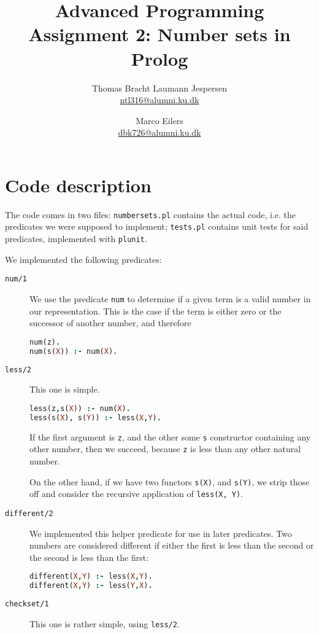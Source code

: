 \documentclass[a4paper]{article}
\title{Advanced Programming\\ Assignment 2: Number sets in Prolog}
\author{Thomas Bracht Laumann Jespersen\\ \url{ntl316@alumni.ku.dk} \and Marco Eilers\\ \url{dbk726@alumni.ku.dk} }
\newcommand{\pfuncn}[2]{\textnormal{\texttt{#1/#2}}\xspace}
\begin{document}
\maketitle
\section*{Code description}
The code comes in two files: \texttt{numbersets.pl} contains the actual code, i.e. the predicates we were supposed to implement; \texttt{tests.pl} contains unit tests for said predicates, implemented with \texttt{plunit}.

We implemented the following predicates:

\begin{description}
\item[\pfuncn{num}{1}] We use the predicate \texttt{num} to determine if a given term is a valid number in our representation. This is the case if the term is either zero or the successor of another number, and therefore
\begin{lstlisting}[language=prolog]
num(z).
num(s(X)) :- num(X).
\end{lstlisting}
\item[\pfuncn{less}{2}] This one is simple.
\begin{lstlisting}[language=prolog]
less(z,s(X)) :- num(X).
less(s(X), s(Y)) :- less(X,Y).
\end{lstlisting}
If the first argument is \texttt{z}, and the other some \texttt{s} constructor containing any other number, then we succeed, because \texttt{z} is less than any other natural number.

On the other hand, if we have two functors \texttt{s(X)}, and \texttt{s(Y)}, we strip those off and consider the recursive application of \texttt{less(X, Y)}.
\item[\pfuncn{different}{2}] We implemented this helper predicate for use in later predicates. Two numbers are considered different if either the first is less than the second or the second is less than the first:
\begin{lstlisting}[language=prolog]
different(X,Y) :- less(X,Y).
different(X,Y) :- less(Y,X).
\end{lstlisting}
\item[\pfuncn{checkset}{1}] This one is rather simple, using \pfuncn{less}{2}.


\end{description}
\end{document}
